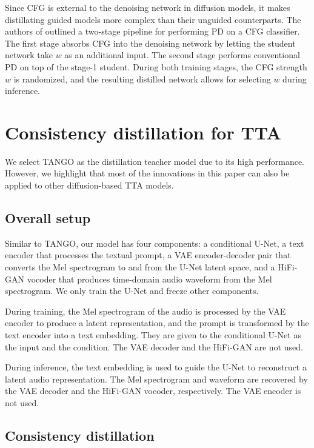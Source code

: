\documentclass{article}
\begin{document}
Since CFG is external to the denoising network in diffusion models, it makes distillating guided models more complex than their unguided counterparts. The authors of \cite{distillcfg} outlined a two-stage pipeline for performing PD on a CFG classifier. The first stage absorbs CFG into the denoising network by letting the student network take $w$ as an additional input. The second stage performs conventional PD on top of the stage-1 student. During both training stages, the CFG strength $w$ is randomized, and the resulting distilled network allows for selecting $w$ during inference.



\section{Consistency distillation for TTA} \label{sec:methods}

We select TANGO \cite{tango} as the distillation teacher model due to its high performance. However, we highlight that most of the innovations in this paper can also be applied to other diffusion-based TTA models.


\subsection{Overall setup}

Similar to TANGO, our model has four components: a conditional U-Net, a text encoder that processes the textual prompt, a VAE encoder-decoder pair that converts the Mel spectrogram to and from the U-Net latent space, and a HiFi-GAN vocoder \cite{hifigan} that produces time-domain audio waveform from the Mel spectrogram. We only train the U-Net and freeze other components.

During training, the Mel spectrogram of the audio is processed by the VAE encoder to produce a latent representation, and the prompt is transformed by the text encoder into a text embedding. They are given to the conditional U-Net as the input and the condition. The VAE decoder and the HiFi-GAN are not used.

During inference, the text embedding is used to guide the U-Net to reconstruct a latent audio representation. The Mel spectrogram and waveform are recovered by the VAE decoder and the HiFi-GAN vocoder, respectively. The VAE encoder is not used.


\subsection{Consistency distillation}
\end{document}
